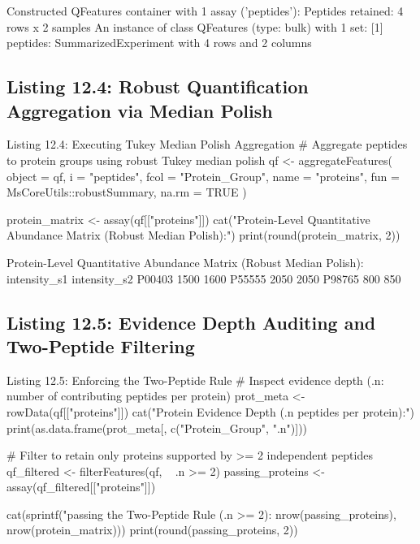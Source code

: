 \documentclass[11pt,twoside,openright]{book}
\begin{document}
\begin{routput}
Constructed QFeatures container with 1 assay ('peptides'):
  Peptides retained: 4 rows x 2 samples
An instance of class QFeatures (type: bulk) with 1 set:
 [1] peptides: SummarizedExperiment with 4 rows and 2 columns
\end{routput}

\subsection{Listing 12.4: Robust Quantification Aggregation via Median Polish}

\begin{rchunk}{Listing 12.4: Executing Tukey Median Polish Aggregation}
# Aggregate peptides to protein groups using robust Tukey median polish
qf <- aggregateFeatures(
  object = qf,
  i = "peptides",
  fcol = "Protein_Group",
  name = "proteins",
  fun = MsCoreUtils::robustSummary,
  na.rm = TRUE
)

protein_matrix <- assay(qf[["proteins"]])
cat("Protein-Level Quantitative Abundance Matrix (Robust Median Polish):\n")
print(round(protein_matrix, 2))
\end{rchunk}

\begin{routput}
Protein-Level Quantitative Abundance Matrix (Robust Median Polish):
       intensity\_s1 intensity\_s2
P00403         1500         1600
P55555         2050         2050
P98765          800          850
\end{routput}

\subsection{Listing 12.5: Evidence Depth Auditing and Two-Peptide Filtering}

\begin{rchunk}{Listing 12.5: Enforcing the Two-Peptide Rule}
# Inspect evidence depth (.n: number of contributing peptides per protein)
prot_meta <- rowData(qf[["proteins"]])
cat("Protein Evidence Depth (.n peptides per protein):\n")
print(as.data.frame(prot_meta[, c("Protein_Group", ".n")]))

# Filter to retain only proteins supported by >= 2 independent peptides
qf_filtered <- filterFeatures(qf, ~ .n >= 2)
passing_proteins <- assay(qf_filtered[["proteins"]])

cat(sprintf("\nProteins passing the Two-Peptide Rule (.n >= 2): %
            nrow(passing_proteins), nrow(protein_matrix)))
print(round(passing_proteins, 2))
\end{rchunk}
\end{document}
